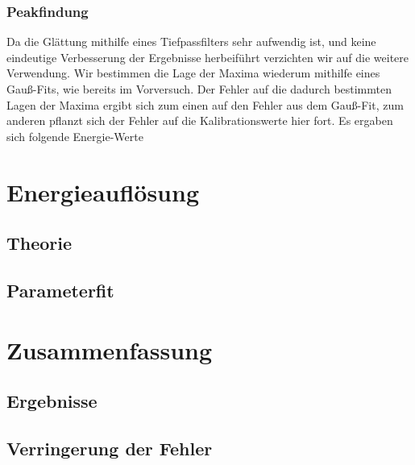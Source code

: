 \documentclass{../Misc/MontavonLaTeX/Montavon}
\begin{document}
\subsubsection{Peakfindung}
Da die Glättung mithilfe eines Tiefpassfilters sehr aufwendig ist,
und keine eindeutige Verbesserung der Ergebnisse herbeiführt verzichten
wir auf die weitere Verwendung. Wir bestimmen die Lage der Maxima
wiederum mithilfe eines Gauß-Fits, wie bereits im Vorversuch. Der
Fehler auf die dadurch bestimmten Lagen der Maxima ergibt sich zum
einen auf den Fehler aus dem Gauß-Fit, zum anderen pflanzt sich der
Fehler auf die Kalibrationswerte hier fort. Es ergaben sich folgende
Energie-Werte 

\begin{table}[h]
\centering
\small
\makebox[\textwidth][c]{}
\end{table}

\section{Energieauflösung}
\subsection{Theorie}

\subsection{Parameterfit}

\section{Zusammenfassung}
\subsection{Ergebnisse}

\subsection{Verringerung der Fehler}
\end{document}
